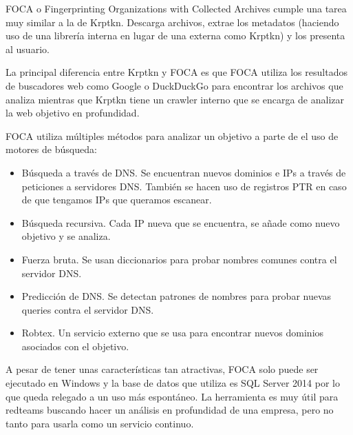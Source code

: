 FOCA o Fingerprinting Organizations with Collected Archives cumple una tarea muy similar a la de Krptkn. Descarga archivos, extrae los metadatos (haciendo uso de una librería interna en lugar de una externa como Krptkn) y los presenta al usuario.

La principal diferencia entre Krptkn y FOCA es que FOCA utiliza los resultados de buscadores web como Google o DuckDuckGo para encontrar los archivos que analiza mientras que Krptkn tiene un crawler interno que se encarga de analizar la web objetivo en profundidad.

FOCA utiliza múltiples métodos para analizar un objetivo a parte de el uso de motores de búsqueda:

\begin{itemize}
  \item Búsqueda a través de DNS. Se encuentran nuevos dominios e IPs a través de peticiones a servidores DNS. También se hacen uso de registros PTR en caso de que tengamos IPs que queramos escanear.
  \item Búsqueda recursiva. Cada IP nueva que se encuentra, se añade como nuevo objetivo y se analiza. 
  \item Fuerza bruta. Se usan diccionarios para probar nombres comunes contra el servidor DNS.
  \item Predicción de DNS. Se detectan patrones de nombres para probar nuevas queries contra el servidor DNS.
  \item Robtex. Un servicio externo que se usa para encontrar nuevos dominios asociados con el objetivo.
\end{itemize}

A pesar de tener unas características tan atractivas, FOCA solo puede ser ejecutado en Windows y la base de datos que utiliza es SQL Server 2014 por lo que queda relegado a un uso más espontáneo. La herramienta es muy útil para redteams buscando hacer un análisis en profundidad de una empresa, pero no tanto para usarla como un servicio continuo.
